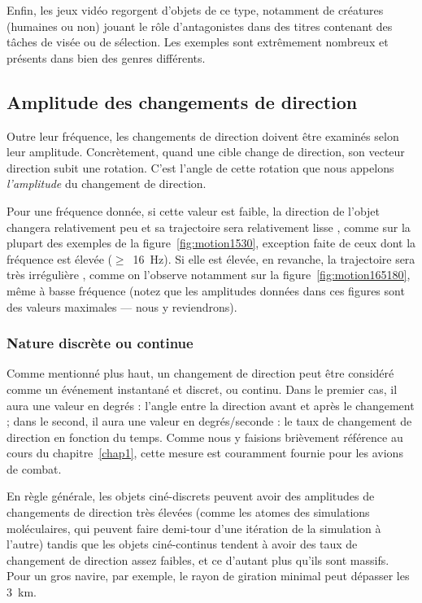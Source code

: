 	Enfin, les jeux vidéo regorgent d'objets de ce type, notamment de créatures (humaines ou non) jouant le rôle d'antagonistes dans des titres contenant des tâches de visée ou de sélection. Les exemples sont extrêmement nombreux et présents dans bien des genres différents.
	
	\FloatBarrier \subsection{Amplitude des changements de direction}
	Outre leur fréquence, les changements de direction doivent être examinés selon leur amplitude. Concrètement, quand une cible change de direction, son vecteur direction subit une rotation. C'est l'angle de cette rotation que nous appelons \emph{l'amplitude} du changement de direction.
	
	Pour une fréquence donnée, si cette valeur est faible, la direction de l'objet changera relativement peu et sa trajectoire sera relativement \og lisse \fg{}, comme sur la plupart des exemples de la figure~\ref{fig:motion1530}, exception faite de ceux dont la fréquence est élevée ($\geq$~16~Hz). Si elle est élevée, en revanche, la trajectoire sera très \og irrégulière \fg{}, comme on l'observe notamment sur la figure~\ref{fig:motion165180}, même à basse fréquence (notez que les amplitudes données dans ces figures sont des valeurs maximales --- nous y reviendrons).
	
	\FloatBarrier \subsubsection{Nature discrète ou continue}
	Comme mentionné plus haut, un changement de direction peut être considéré comme un événement instantané et discret, ou continu. Dans le premier cas, il aura une valeur en degrés : l'angle entre la direction avant et après le changement ; dans le second, il aura une valeur en degrés/seconde : le taux de changement de direction en fonction du temps. Comme nous y faisions brièvement référence au cours du chapitre~\ref{chap1}, cette mesure est couramment fournie pour les avions de combat.
	
	En règle générale, les objets ciné-discrets peuvent avoir des amplitudes de changements de direction très élevées (comme les atomes des simulations moléculaires, qui peuvent faire demi-tour d'une itération de la simulation à l'autre) tandis que les objets ciné-continus tendent à avoir des taux de changement de direction assez faibles, et ce d'autant plus qu'ils sont massifs. Pour un gros navire, par exemple, le rayon de giration minimal peut dépasser les 3~km\footnotemark{}.
	
